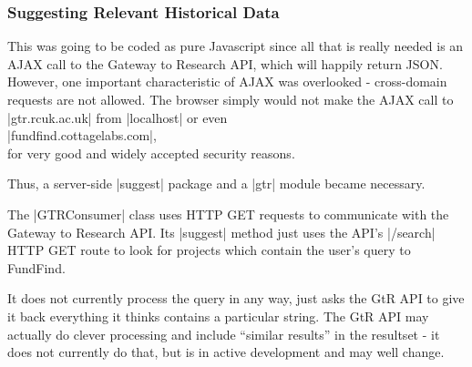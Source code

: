 \subsubsection{Suggesting Relevant Historical Data}

This was going to be coded as pure Javascript since all that is really needed is an AJAX call to the Gateway to Research API, which will happily return JSON. However, one important characteristic of AJAX was overlooked - cross-domain requests are not allowed. The browser simply would not make the AJAX call to |gtr.rcuk.ac.uk| from |localhost| or even
\\|fundfind.cottagelabs.com|, 
\\for very good and widely accepted security reasons.

Thus, a server-side |suggest| package and a |gtr| module became necessary.

The |GTRConsumer| class uses HTTP GET requests to communicate with the Gateway to Research API. Its |suggest| method just uses the API's |/search| HTTP GET route to look for projects which contain the user's query to FundFind.

It does not currently process the query in any way, just asks the GtR API to give it back everything it thinks contains a particular string. The GtR API may actually do clever processing and include ``similar results'' in the resultset - it does not currently do that, but is in active development and may well change.

